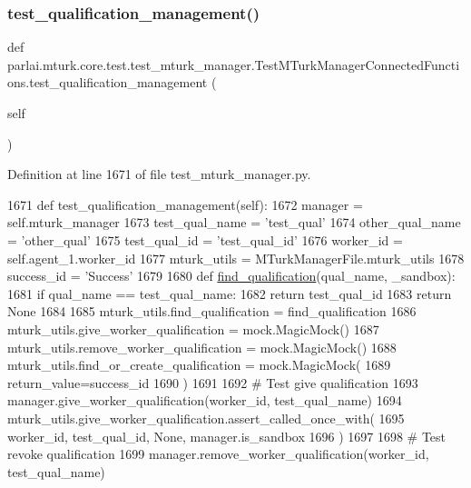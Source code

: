 \subsubsection{\texorpdfstring{test\+\_\+qualification\+\_\+management()}{test\_qualification\_management()}}
{\footnotesize\ttfamily def parlai.\+mturk.\+core.\+test.\+test\+\_\+mturk\+\_\+manager.\+Test\+M\+Turk\+Manager\+Connected\+Functions.\+test\+\_\+qualification\+\_\+management (\begin{DoxyParamCaption}\item[{}]{self }\end{DoxyParamCaption})}



Definition at line 1671 of file test\+\_\+mturk\+\_\+manager.\+py.


\begin{DoxyCode}
1671     \textcolor{keyword}{def }test\_qualification\_management(self):
1672         manager = self.mturk\_manager
1673         test\_qual\_name = \textcolor{stringliteral}{'test\_qual'}
1674         other\_qual\_name = \textcolor{stringliteral}{'other\_qual'}
1675         test\_qual\_id = \textcolor{stringliteral}{'test\_qual\_id'}
1676         worker\_id = self.agent\_1.worker\_id
1677         mturk\_utils = MTurkManagerFile.mturk\_utils
1678         success\_id = \textcolor{stringliteral}{'Success'}
1679 
1680         \textcolor{keyword}{def }\hyperlink{namespaceparlai_1_1mturk_1_1core_1_1dev_1_1mturk__utils_acd636315cbbf11cc5d9d641173e51586}{find\_qualification}(qual\_name, \_sandbox):
1681             \textcolor{keywordflow}{if} qual\_name == test\_qual\_name:
1682                 \textcolor{keywordflow}{return} test\_qual\_id
1683             \textcolor{keywordflow}{return} \textcolor{keywordtype}{None}
1684 
1685         mturk\_utils.find\_qualification = find\_qualification
1686         mturk\_utils.give\_worker\_qualification = mock.MagicMock()
1687         mturk\_utils.remove\_worker\_qualification = mock.MagicMock()
1688         mturk\_utils.find\_or\_create\_qualification = mock.MagicMock(
1689             return\_value=success\_id
1690         )
1691 
1692         \textcolor{comment}{# Test give qualification}
1693         manager.give\_worker\_qualification(worker\_id, test\_qual\_name)
1694         mturk\_utils.give\_worker\_qualification.assert\_called\_once\_with(
1695             worker\_id, test\_qual\_id, \textcolor{keywordtype}{None}, manager.is\_sandbox
1696         )
1697 
1698         \textcolor{comment}{# Test revoke qualification}
1699         manager.remove\_worker\_qualification(worker\_id, test\_qual\_name)

\end{DoxyCode}
